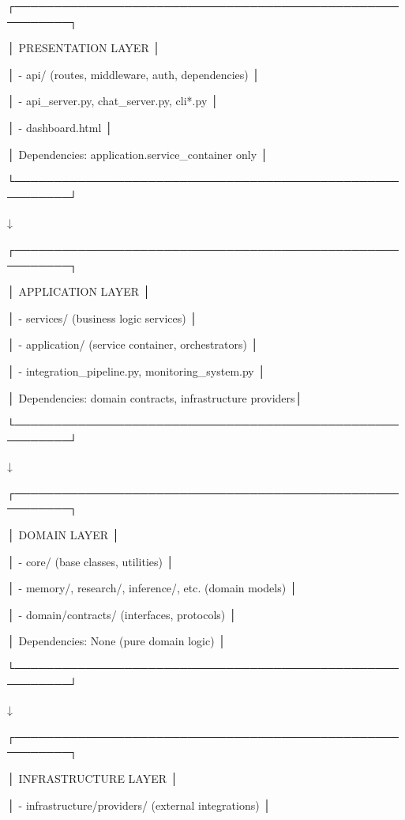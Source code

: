 \documentclass[11pt,a4paper]{article}
\begin{document}
┌─────────────────────────────────────────────────────────┐

│  PRESENTATION LAYER                                     │

│  - api/ (routes, middleware, auth, dependencies)       │

│  - api\_server.py, chat\_server.py, cli*.py              │

│  - dashboard.html                                       │

│  Dependencies: application.service\_container only      │

└─────────────────────────────────────────────────────────┘

                          ↓

┌─────────────────────────────────────────────────────────┐

│  APPLICATION LAYER                                      │

│  - services/ (business logic services)                  │

│  - application/ (service container, orchestrators)     │

│  - integration\_pipeline.py, monitoring\_system.py        │

│  Dependencies: domain contracts, infrastructure providers│

└─────────────────────────────────────────────────────────┘

                          ↓

┌─────────────────────────────────────────────────────────┐

│  DOMAIN LAYER                                           │

│  - core/ (base classes, utilities)                     │

│  - memory/, research/, inference/, etc. (domain models) │

│  - domain/contracts/ (interfaces, protocols)            │

│  Dependencies: None (pure domain logic)                 │

└─────────────────────────────────────────────────────────┘

                          ↓

┌─────────────────────────────────────────────────────────┐

│  INFRASTRUCTURE LAYER                                   │

│  - infrastructure/providers/ (external integrations)   │
\end{document}
